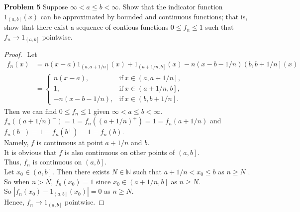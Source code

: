 \documentclass{article}
\newcommand{\bbn}{\mathbb{N}}
\begin{document}
\noindent \textbf{Problem 5} Suppose $\infty < a \leq b < \infty$. Show that the indicator function $1_{\left.\left(a,b\right.\right]}(x)$ can be approximated by bounded and continuous functions; that is, show that there exist a sequence of contious functions $0 \leq f_n \leq 1$ such that $f_n \to 1_{\left.\left(a,b\right.\right]}$ pointwise.

\begin{proof}
	$ $ \newline
	Let
	\begin{align*}
		f_n(x) &= n(x-a)1_{\left.\left(a,a+1/n\right.\right]}(x) + 1_{\left.\left(a+1/n,b\right.\right]}(x) - n(x-b-1/n) \left.\left(b,b+1/n\right.\right](x)\\
			&= 
			\begin{cases}
		      	n(x-a), & \text{if}\ x \in \left.\left(a,a+1/n\right.\right],\\
		      	1, & \text{if}\ x \in \left.\left(a+1/n,b\right.\right],\\
		      	- n(x-b-1/n), & \text{if}\ x \in \left.\left(b,b+1/n\right.\right].
		    \end{cases}
	\end{align*}
	Then we can find $0 \leq f_n \leq 1$ given $\infty < a \leq b < \infty$.\\
	$f_n((a+1/n)^{-}) = 1 = f_n((a+1/n)^{+}) = 1 = f_n(a+1/n)$ and $f_n(b^{-}) = 1 = f_n(b^{+}) = 1 = f_n(b)$.\\
	Namely, $f$ is continuous at point $a+1/n$ and $b$.\\
	It is obvious that $f$ is also continuous on other points of $\left.\left(a,b\right.\right]$.\\
	Thus, $f_n$ is continuous on $\left.\left(a,b\right.\right]$.\\
	Let $x_0 \in \left.\left(a,b\right.\right] $. Then there exists $N \in \bbn$ such that $a+1/n < x_0 \leq b$ as $n \geq N$ .\\	
	So when $n > N$, $f_n(x_0) = 1$ since $x_0 \in \left.\left(a+1/n,b\right.\right]$ as $n \geq N$. \\
	So $|f_n(x_0) - 1_{\left.\left(a,b\right.\right]}(x_0)| = 0$ as $n \geq N$.\\
	Hence, $f_n \to 1_{\left.\left(a,b\right.\right]}$ pointwise.

\end{proof}
\end{document}
